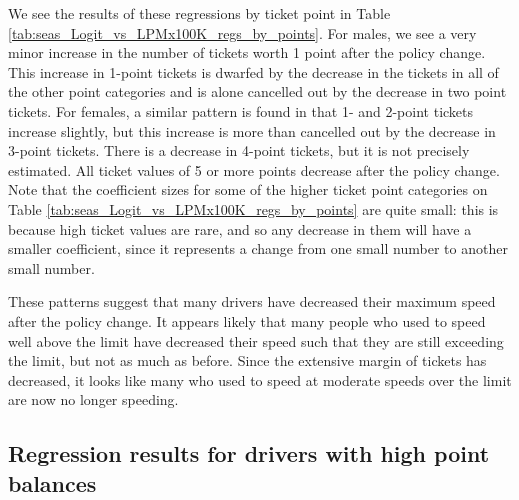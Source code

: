 




We see the results of these regressions by ticket point in 
Table \ref{tab:seas_Logit_vs_LPMx100K_regs_by_points}. 
For males, we see a very minor increase in the number of tickets 
worth 1 point after the policy change. 
This increase in 1-point tickets is dwarfed by the decrease in the tickets 
in all of the other point categories and is alone cancelled out 
by the decrease in two point tickets. 
For females, a similar pattern is found in that 1- and 2-point tickets increase slightly,
but this increase is more than cancelled out by the decrease in 3-point tickets. 
There is a decrease in 4-point tickets, but it is not precisely estimated. 
All ticket values of 5 or more points decrease after the policy change. 
Note that the coefficient sizes for some of the higher ticket point categories on 
Table \ref{tab:seas_Logit_vs_LPMx100K_regs_by_points}
are quite small: 
this is because high ticket values are rare, 
and so any decrease in them will have a smaller coefficient, 
since it represents a change from one small number to another small number.

These patterns suggest that many drivers have decreased their maximum speed 
after the policy change. 
It appears likely that many people who used to speed well above the limit 
have decreased their speed such that they are still exceeding the limit, 
but not as much as before. 
Since the extensive margin of tickets has decreased, 
it looks like many who used to speed at moderate speeds over the limit 
are now no longer speeding.


\subsection{Regression results for drivers with high point balances}
\label{sec:Empirical_high_pts}


